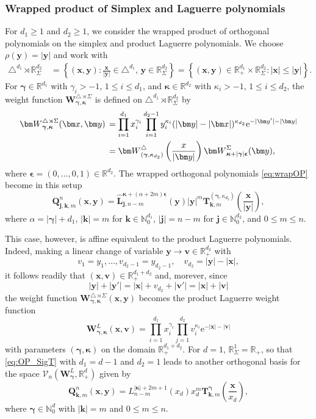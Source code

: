 \documentclass{amsart}
\theoremstyle{remark}
\def\e{\mathrm{e}}
\def\g{{\gamma}}
\def\k{{\kappa}}
\def\kb{{\bm k}}
\def\vb{{\bm v}}
\def\xb{{\bm x}}
\def\yb{{\bm y}}
\def\Lb{{\bm L}}
\def\Wb{{\bm W}}
\def\CV{{\mathcal V}}
\def\NN{{\mathbb N}}
\def\RR{{\mathbb R}}
\def\bep{{\boldsymbol{\epsilon}}}
\def\bg{{\boldsymbol{\gamma}}}
\def\bk{{\boldsymbol{\kappa}}}
\begin{document}
\subsubsection{Wrapped product of Simplex and Laguerre polynomials}\label{subsec:T-L}
 For $d_1 \ge 1$ and $d_2 \ge 1$, we consider
the wrapped product of orthogonal polynomials on the simplex and product Laguerre polynomials. We choose
$\rho (\yb) = |\yb|$ and work with
\begin{align*}
\triangle^{d_1}  \rtimes \RR_\Sigma^{d_2} \, & = \left\{(\xb,\yb): \frac{\xb}{|\yb|} \in \triangle^{d_1}, \, \yb \in \RR_\Sigma^{d_2}\right\} 
        = \left\{(\xb,\yb) \in \RR_+^{d_1} \times \RR_\Sigma^{d_2}:  |\xb| \le |\yb|\right\}.
\end{align*}
For $\bg \in \RR^{d_1}$ with $\g_i > -1$, $1 \le i \le d_1$, and $\bk \in \RR^{d_2}$ with $\k_i > -1$, $1\le i \le d_2$, 
the weight function $\Wb_{\bg, \bk}^{\triangle \rtimes \Sigma}$ is defined on $\triangle^{d_1}  \rtimes \RR_\Sigma^{d_2}$ 
by  
\begin{align} \label{eq:W-SigT}
\Wb_{\bg, \bk}^{\triangle \rtimes \Sigma}(\xb,\yb) \, & = \prod_{i=1}^{d_1} x_i^{\g_i}  \prod_{i=1}^{d_2-1} y_i^{\k_i}
     (|\bm y|- |\bm x | )^{\k_{d_2}} \e^{-|\yb'| -|\yb|}\\
  & = \Wb_{(\bg, \k_{d_2})}^{\triangle} \left( \frac{x}{|\bm y|} \right) \Wb_{\bk + |\bg| \bep}^\Sigma(\yb), \notag
\end{align}
where $\bep = (0,\ldots,0,1) \in \RR^{d_2}$. The wrapped orthogonal polynomials \eqref{eq:wrapOP} become in this setup
 \begin{equation} \label{eq:OP_SigT}
 \bm Q_{\bm j, \bm k, m}^n(\bm x,\bm y) = \hat \Lb_{\bm j, n-m}^{\bk+(\alpha+2m)\bep}(\bm y) |\bm y|^m 
      \bm T_{\bm k, m}^{(\bg, \k_{d_2}) } \left(\frac{\bm x}{|\bm y|}\right),
\end{equation}
where $\alpha = |\bg|+ d_1$, $|\bm k| = m$ for $\bm k \in \NN_0^{d_1}$, $|\bm j| = n-m$ for $\bm j \in \NN_0^{d_2}$, 
and $0 \le m  \le n$. 

This case, however, is affine equivalent to the product Laguerre polynomials. Indeed, making a linear change of 
variable $\yb \to \vb \in \RR_+^{d_2}$ with 
$$
v_1= y_1, \ldots, v_{d_2-1} = y_{d_2-1}, \quad v_{d_2} = |\yb| - |\xb|,
$$
it follows readily that $(\xb, \vb) \in \RR_+^{d_1+d_2}$ and, morever, since 
$$
|\yb| + |\yb'| = |\xb| + v_{d_2} + |\vb'| = |\xb| + |\vb|
$$
the weight function $\Wb_{\bg, \bk}^{\triangle \rtimes \Sigma}(\xb,\yb)$ becomes the product Laguerre weight
function 
$$
  \Wb_{\bg,\bk}^L (\xb, \vb) = \prod_{i=1}^{d_1} x_i^{\g_i} \prod_{j=1}^{d_2} v_i^{\k_i} \e^{-|\xb| - |\vb|}
$$
with parameters $(\bg, \bk)$ on the domain $\RR_+^{d_1 + d_2}$. For $d =1$, $\RR_\Sigma^1 = \RR_+$, 
so that \eqref{eq:OP_SigT} with $d_1 = d-1$ and $d_2 = 1$ leads to another orthogonal basis for the space 
$\CV_n(\Wb_\bg^L, \RR_+^{d})$ given by 
$$
    \bm Q_{\bm k, m}^n(\bm x,\bm y) =  L_{n-m}^{|\bk|+2m+1}(x_{d}) x_{d}^m 
      \bm T_{\bm k, m}^{\bg} \left(\frac{\bm x}{x_{d}}\right), 
$$
where $\bg \in \NN_0^{d}$ with $|\kb| = m$ and $0 \le m \le n$. 
\end{document}
